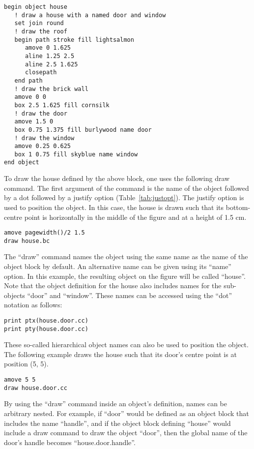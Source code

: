\begin{verbatim}
begin object house
   ! draw a house with a named door and window
   set join round
   ! draw the roof
   begin path stroke fill lightsalmon
      amove 0 1.625
      aline 1.25 2.5
      aline 2.5 1.625
      closepath
   end path
   ! draw the brick wall
   amove 0 0
   box 2.5 1.625 fill cornsilk
   ! draw the door
   amove 1.5 0
   box 0.75 1.375 fill burlywood name door
   ! draw the window
   amove 0.25 0.625
   box 1 0.75 fill skyblue name window
end object
\end{verbatim}

To draw the house defined by the above block, one uses the following draw command. The first argument of the command is the name of the object followed by a dot followed by a justify option (Table~\ref{tab:justopt}). The justify option is used to position the object. In this case, the house is drawn such that its bottom-centre point is horizontally in the middle of the figure and at a height of 1.5 cm.

\begin{verbatim}
amove pagewidth()/2 1.5
draw house.bc
\end{verbatim}

The ``draw'' command names the object using the same name as the name of the object block by default. An alternative name can be given using its ``name'' option. In this example, the resulting object on the figure will be called ``house''. Note that the object definition for the house also includes names for the sub-objects ``door'' and ``window''. These names can be accessed using the ``dot'' notation as follows:

\begin{verbatim}
print ptx(house.door.cc)
print pty(house.door.cc)
\end{verbatim}

These so-called hierarchical object names can also be used to position the object. The following example draws the house such that its door's centre point is at position (5, 5).

\begin{verbatim}
amove 5 5
draw house.door.cc
\end{verbatim}

By using the ``draw'' command inside an object's definition, names can be arbitrary nested. For example, if ``door'' would be defined as an object block that includes the name ``handle'', and if the object block defining ``house'' would include a draw command to draw the object ``door'', then the global name of the door's handle becomes ``house.door.handle''.

